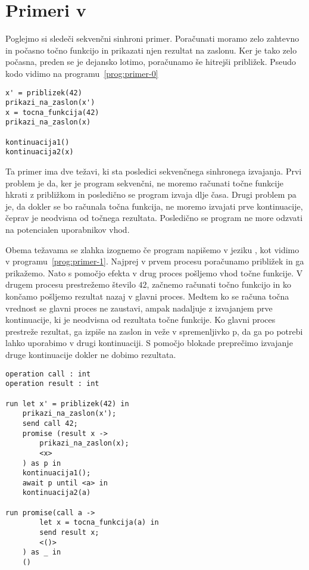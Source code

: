 \section{Primeri v \aeff{}} \label{sec:primeri-aeff}

Poglejmo si sledeči sekvenčni sinhroni primer. Poračunati moramo zelo zahtevno in počasno točno funkcijo in prikazati njen rezultat na zaslonu. Ker je tako zelo počasna, preden se je dejansko lotimo, poračunamo še hitrejši približek. Pseudo kodo vidimo na programu~\ref{prog:primer-0}

\begin{lstlisting}[caption={Sinhron sekvečni primer.},label={prog:primer-0},float,floatplacement=h]
x' = priblizek(42)
prikazi_na_zaslon(x')
x = tocna_funkcija(42)
prikazi_na_zaslon(x)

kontinuacija1()
kontinuacija2(x)
\end{lstlisting}

Ta primer ima dve težavi, ki sta posledici sekvenčnega sinhronega izvajanja. Prvi problem je da, ker je program sekvenčni, ne moremo računati točne funkcije hkrati z približkom in posledično se program izvaja dlje časa. Drugi problem pa je, da dokler se bo računala točna funkcija, ne moremo izvajati prve kontinuacije, čeprav je neodvisna od točnega rezultata. Posledično se program ne more odzvati na potencialen uporabnikov vhod.  

Obema težavama se zlahka izognemo če program napišemo v jeziku \aeff, kot vidimo v programu~\ref{prog:primer-1}. Najprej v prvem procesu poračunamo približek in ga prikažemo. Nato s pomočjo efekta v drug proces pošljemo vhod točne funkcije. V drugem procesu prestrežemo število $42$, začnemo računati točno funkcijo in ko končamo pošljemo rezultat nazaj v glavni proces. Medtem ko se računa točna vrednost se glavni proces ne zaustavi, ampak nadaljuje z izvajanjem prve kontinuacije, ki je neodvisna od rezultata točne funkcije. Ko glavni proces prestreže rezultat, ga izpiše na zaslon in veže v spremenljivko p, da ga po potrebi lahko uporabimo v drugi kontinuaciji. S pomočjo blokade preprečimo izvajanje druge kontinuacije dokler ne dobimo rezultata.

\begin{lstlisting}[caption={Asinhron Vzporeden primer.},label={prog:primer-1},float,floatplacement=h]
operation call : int
operation result : int
 
run let x' = priblizek(42) in
    prikazi_na_zaslon(x');
    send call 42;
    promise (result x ->
    	prikazi_na_zaslon(x);
    	<x>
    ) as p in
    kontinuacija1();
    await p until <a> in
    kontinuacija2(a)

run promise(call a ->
    	let x = tocna_funkcija(a) in
    	send result x;
    	<()>
    ) as _ in
    ()
\end{lstlisting}
